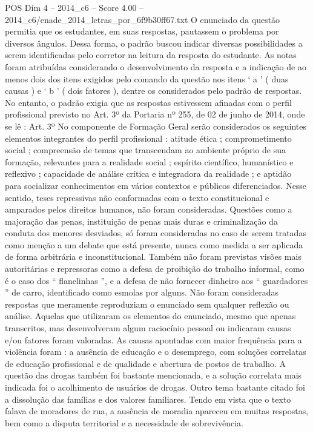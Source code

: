 \begin{textsample}{POS Dim 4 – 2014\_c6 – Score 4.00 – 2014\_c6/enade\_2014\_letras\_por\_6f9b30ff67.txt}
O enunciado da questão permitia que os estudantes, em suas respostas, pautassem o problema por diversos ângulos.
Dessa forma, o padrão buscou indicar diversas possibilidades a serem identificadas pelo corretor na leitura da resposta do estudante.
As notas foram atribuídas considerando o desenvolvimento da resposta e a indicação de ao menos dois dos itens exigidos pelo comando da questão nos itens ‘ a ’ ( duas causas ) e ‘ b ’ ( dois fatores ), dentre os considerados pelo padrão de respostas.
No entanto, o padrão exigia que as respostas estivessem afinadas com o perfil profissional previsto no Art. 3º da Portaria nº 255, de 02 de junho de 2014, onde se lê : Art. 3º No componente de Formação Geral serão considerados os seguintes elementos integrantes do perfil profissional : atitude ética ; comprometimento social ; compreensão de temas que transcendam ao ambiente próprio de sua formação, relevantes para a realidade social ; espírito científico, humanístico e reflexivo ; capacidade de análise crítica e integradora da realidade ; e aptidão para socializar conhecimentos em vários contextos e públicos diferenciados.
Nesse sentido, teses repressivas não conformadas com o texto constitucional e amparados pelos direitos humanos, não foram consideradas.
Questões como a majoração das penas, instituição de penas mais duras e criminalização da conduta dos menores desviados, só foram consideradas no caso de serem tratadas como menção a um debate que está presente, nunca como medida a ser aplicada de forma arbitrária e inconstitucional.
Também não foram previstas visões mais autoritárias e repressoras como a defesa de proibição do trabalho informal, como é o caso dos “ flanelinhas ”, e a defesa de não fornecer dinheiro aos “ guardadores ” de carro, identificado como esmolas por alguns.
Não foram consideradas respostas que meramente reproduziam o enunciado sem qualquer reflexão ou análise.
Aquelas que utilizaram os elementos do enunciado, mesmo que apenas transcritos, mas desenvolveram algum raciocínio pessoal ou indicaram causas e/ou fatores foram valoradas.
As causas apontadas com maior frequência para a violência foram : a ausência de educação e o desemprego, com soluções correlatas de educação profissional e de qualidade e abertura de postos de trabalho.
A questão das drogas também foi bastante mencionada, e a solução correlata mais indicada foi o acolhimento de usuários de drogas.
Outro tema bastante citado foi a dissolução das famílias e dos valores familiares.
Tendo em vista que o texto falava de moradores de rua, a ausência de moradia apareceu em muitas respostas, bem como a disputa territorial e a necessidade de sobrevivência.

\end{textsample}
